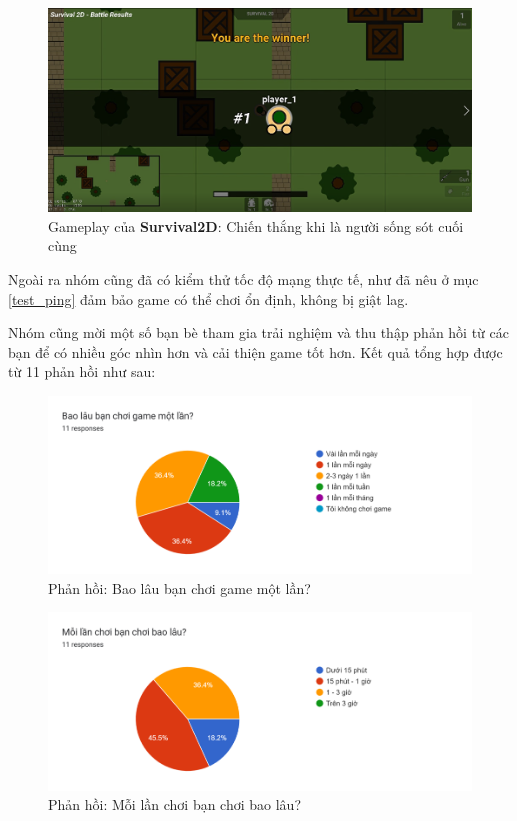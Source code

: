 \documentclass[12pt,a4paper]{article}
\begin{document}
  \begin{figure}[H]
      \centering
      \includegraphics[width=\textwidth]{Img/game_screen_shoot/win.png}
      \caption{Gameplay của \textbf{Survival2D}: Chiến thắng khi là người sống sót cuối cùng}
  \end{figure}

Ngoài ra nhóm cũng đã có kiểm thử tốc độ mạng thực tế, như đã nêu ở mục \ref{test_ping} đảm bảo game có thể chơi ổn định, không bị giật lag.

  Nhóm cũng mời một số bạn bè tham gia trải nghiệm và thu thập phản hồi từ các bạn để có nhiều góc nhìn hơn và cải thiện game tốt hơn. Kết quả tổng hợp được từ 11 phản hồi như sau:
  \begin{figure}[H]
      \centering
      \includegraphics[width=\textwidth]{Img/response/response1.png}
      \caption{Phản hồi: Bao lâu bạn chơi game một lần?}
  \end{figure}

  \begin{figure}[H]
      \centering
      \includegraphics[width=\textwidth]{Img/response/response2.png}
      \caption{Phản hồi: Mỗi lần chơi bạn chơi bao lâu?}
  \end{figure}
\end{document}
